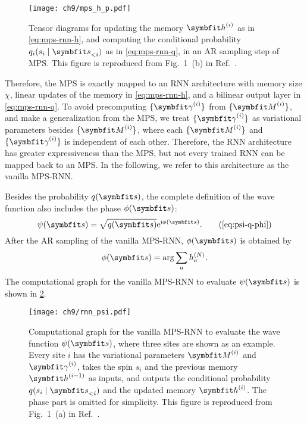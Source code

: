 \begin{figure}[htb]
\centering
\texttt{[image: ch9/mps\_h\_p.pdf]}
\caption[Tensor diagrams for an AR sampling step of MPS]{
Tensor diagrams for updating the memory $\vh^{(i)}$ as in \cref{eq:mps-rnn-h}, and computing the conditional probability $q_i(s_i \mid \vs_{< i})$ as in \cref{eq:mps-rnn-q}, in an AR sampling step of MPS.
This figure is reproduced from Fig.~1~(b) in Ref.~\cite{wu2023tensor}.
}
\label{fig:mps-h-p}
\end{figure}

Therefore, the MPS is exactly mapped to an RNN architecture with memory size $\chi$, linear updates of the memory in \cref{eq:mps-rnn-h}, and a bilinear output layer in \cref{eq:mps-rnn-q}. To avoid precomputing $\{\mga^{(i)}\}$ from $\{\mM^{(i)}\}$, and make a generalization from the MPS, we treat $\{\mga^{(i)}\}$ as variational parameters besides $\{\mM^{(i)}\}$, where each $\{\mM^{(i)}\}$ and $\{\mga^{(i)}\}$ is independent of each other. Therefore, the RNN architecture has greater expressiveness than the MPS, but not every trained RNN can be mapped back to an MPS. In the following, we refer to this architecture as the vanilla MPS-RNN.

Besides the probability $q(\vs)$, the complete definition of the wave function also includes the phase $\phi(\vs)$:
\begin{equation}
\psi(\vs) = \sqrt{q(\vs)} \rme^{\rmi \phi(\vs)}.
\tag{\ref{eq:psi-q-phi}}
\end{equation}
After the AR sampling of the vanilla MPS-RNN, $\phi(\vs)$ is obtained by
\begin{equation}
\phi(\vs) = \arg \sum_{a} h^{(N)}_a.
\label{eq:mps-rnn-phase}
\end{equation}
The computational graph for the vanilla MPS-RNN to evaluate $\psi(\vs)$ is shown in \cref{fig:rnn-psi}.

\begin{figure}[htb]
\centering
\texttt{[image: ch9/rnn\_psi.pdf]}
\caption[Computational graph for vanilla MPS-RNN]{
Computational graph for the vanilla MPS-RNN to evaluate the wave function $\psi(\vs)$, where three sites are shown as an example.
Every site $i$ has the variational parameters $\mM^{(i)}$ and $\mga^{(i)}$, takes the spin $s_i$ and the previous memory $\vh^{(i - 1)}$ as inputs, and outputs the conditional probability $q(s_i \mid \vs_{< i})$ and the updated memory $\vh^{(i)}$.
The phase part is omitted for simplicity.
This figure is reproduced from Fig.~1~(a) in Ref.~\cite{wu2023tensor}.
}
\label{fig:rnn-psi}
\end{figure}


